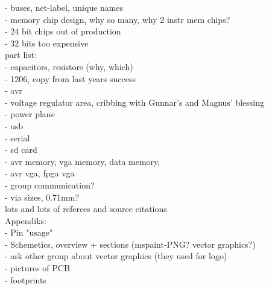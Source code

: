     - buses, net-label, unique names \\

    - memory chip design, why so many, why 2 instr mem chips? \\
    - 24 bit chips out of production \\
    - 32 bits too expensive \\


    part list: \\
    - capacitors, resistors (why, which) \\
    - 1206, copy from last years success \\
    - avr \\
    - voltage regulator area, cribbing with Gunnar's and Magnus' blessing \\
    - power plane \\
    - usb \\
    - serial \\
    - sd card \\
    - avr memory, vga memory, data memory, \\
    - avr vga, fpga vga \\
    - group communication? \\

    - via sizes, 0.71mm? \\

    lots and lots of referces and source citations \\


    Appendiks: \\
    - Pin "usage" \\
    - Schemetics, overview + sections (mspaint-PNG? vector graphics?) \\
    - ask other group about vector graphics (they used for logo) \\
        - pictures of PCB \\
        - footprints \\



